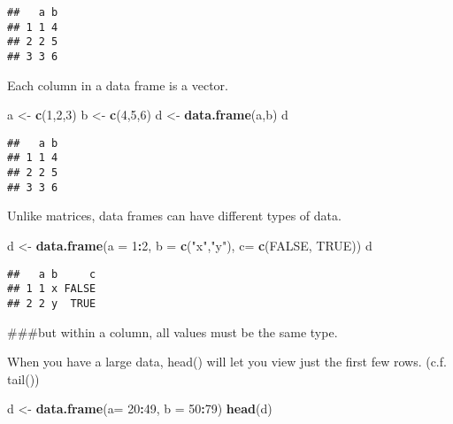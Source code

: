 \documentclass[
]{article}
\newenvironment{Shaded}{\begin{snugshade}}{\end{snugshade}}
\newcommand{\DataTypeTok}[1]{\textcolor[rgb]{0.13,0.29,0.53}{#1}}
\newcommand{\DecValTok}[1]{\textcolor[rgb]{0.00,0.00,0.81}{#1}}
\newcommand{\KeywordTok}[1]{\textcolor[rgb]{0.13,0.29,0.53}{\textbf{#1}}}
\newcommand{\NormalTok}[1]{#1}
\newcommand{\OperatorTok}[1]{\textcolor[rgb]{0.81,0.36,0.00}{\textbf{#1}}}
\newcommand{\OtherTok}[1]{\textcolor[rgb]{0.56,0.35,0.01}{#1}}
\newcommand{\StringTok}[1]{\textcolor[rgb]{0.31,0.60,0.02}{#1}}
\begin{document}
\begin{verbatim}
##   a b
## 1 1 4
## 2 2 5
## 3 3 6
\end{verbatim}

Each column in a data frame is a vector.

\begin{Shaded}
\begin{Highlighting}[]
\NormalTok{a <-}\StringTok{ }\KeywordTok{c}\NormalTok{(}\DecValTok{1}\NormalTok{,}\DecValTok{2}\NormalTok{,}\DecValTok{3}\NormalTok{)}
\NormalTok{b <-}\StringTok{ }\KeywordTok{c}\NormalTok{(}\DecValTok{4}\NormalTok{,}\DecValTok{5}\NormalTok{,}\DecValTok{6}\NormalTok{)}
\NormalTok{d <-}\StringTok{ }\KeywordTok{data.frame}\NormalTok{(a,b)}
\NormalTok{d}
\end{Highlighting}
\end{Shaded}

\begin{verbatim}
##   a b
## 1 1 4
## 2 2 5
## 3 3 6
\end{verbatim}

Unlike matrices, data frames can have different types of data.

\begin{Shaded}
\begin{Highlighting}[]
\NormalTok{d <-}\StringTok{ }\KeywordTok{data.frame}\NormalTok{(}\DataTypeTok{a =} \DecValTok{1}\OperatorTok{:}\DecValTok{2}\NormalTok{, }\DataTypeTok{b =} \KeywordTok{c}\NormalTok{(}\StringTok{"x"}\NormalTok{,}\StringTok{"y"}\NormalTok{), }\DataTypeTok{c=} \KeywordTok{c}\NormalTok{(}\OtherTok{FALSE}\NormalTok{, }\OtherTok{TRUE}\NormalTok{))}
\NormalTok{d}
\end{Highlighting}
\end{Shaded}

\begin{verbatim}
##   a b     c
## 1 1 x FALSE
## 2 2 y  TRUE
\end{verbatim}

\#\#\#but within a column, all values must be the same type.

When you have a large data, head() will let you view just the first few
rows. (c.f. tail())

\begin{Shaded}
\begin{Highlighting}[]
\NormalTok{d <-}\StringTok{ }\KeywordTok{data.frame}\NormalTok{(}\DataTypeTok{a=} \DecValTok{20}\OperatorTok{:}\DecValTok{49}\NormalTok{, }\DataTypeTok{b =} \DecValTok{50}\OperatorTok{:}\DecValTok{79}\NormalTok{)}
\KeywordTok{head}\NormalTok{(d)}
\end{Highlighting}
\end{Shaded}
\end{document}
